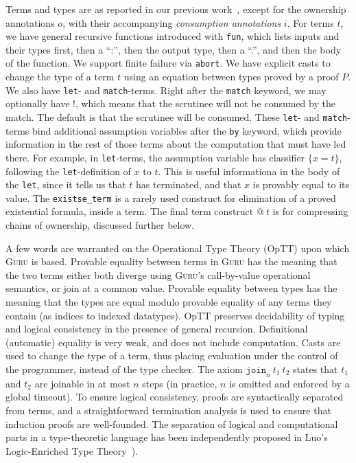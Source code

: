\documentclass[9pt,natbib]{sigplanconf}
\begin{document}
Terms and types are as reported in our previous work~\cite{guru09},
except for the ownership annotations $o$, with their accompanying
\emph{consumption annotations} $i$.  For terms $t$, we have general
recursive functions introduced with \texttt{fun}, which lists inputs
and their types first, then a ``:'', then the output type, then a
``.'', and then the body of the function.  We support finite failure
via \texttt{abort}.  We have explicit casts to change the type of a
term $t$ using an equation between types proved by a proof $P$.  We
also have \texttt{let}- and \texttt{match}-terms.  Right after the
\texttt{match} keyword, we may optionally have $!$, which means that
the scrutinee will not be consumed by the match.  The default is that
the scrutinee will be consumed.  These \texttt{let}- and
\texttt{match}-terms bind additional assumption variables after the
\texttt{by} keyword, which provide information in the rest of those
terms about the computation that must have led there.  For example, in
\texttt{let}-terms, the assumption variable has classifier $\{ x = t
\}$, following the \texttt{let}-definition of $x$ to $t$.  This is
useful informationa in the body of the \texttt{let}, since it tells us
that $t$ has terminated, and that $x$ is provably equal to its value.
The \texttt{existse\_term} is a rarely used construct for elimination
of a proved existential formula, inside a term.  The final term
construct $@\ t$ is for compressing chains of ownership, discussed
further below.

A few words are warranted on the Operational Type Theory (OpTT) upon
which \textsc{Guru} is based.  Provable equality between terms in
\textsc{Guru} has the meaning that the two terms either both diverge
using \textsc{Guru}'s call-by-value operational semantics, or join at
a common value.  Provable equality between types has the meaning that
the types are equal modulo provable equality of any terms they contain
(as indices to indexed datatypes).  OpTT preserves decidability of
typing and logical consistency in the presence of general recursion.
Definitional (automatic) equality is very weak, and does not include
computation.  Casts are used to change the type of a term, thus
placing evaluation under the control of the programmer, instead of the
type checker.  The axiom $\texttt{join}_n\ t_1\ t_2$ states that $t_1$
and $t_2$ are joinable in at most $n$ steps (in practice, $n$ is
omitted and enforced by a global timeout).  To ensure logical
consistency, proofs are syntactically separated from terms, and a
straightforward termination analysis is used to ensure that induction
proofs are well-founded.  The separation of logical and computational
parts in a type-theoretic language has been independently proposed in
Luo's Logic-Enriched Type Theory~\cite{luo08}).
\end{document}
